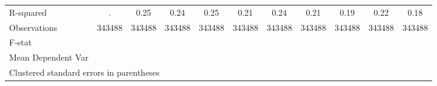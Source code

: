 {\begin{tabular}{l*{10}{c}}
\hline
R-squared           &           .         &        0.25         &        0.24         &        0.25         &        0.21         &        0.24         &        0.21         &        0.19         &        0.22         &        0.18         \\
Observations        &      343488         &      343488         &      343488         &      343488         &      343488         &      343488         &      343488         &      343488         &      343488         &      343488         \\
F-stat              &                     &                     &                     &                     &                     &                     &                     &                     &                     &                     \\
Mean Dependent Var  &                     &                     &                     &                     &                     &                     &                     &                     &                     &                     \\
\hline\hline
\multicolumn{11}{l}{\footnotesize Clustered standard errors in parentheses}\\
\end{tabular}
}
